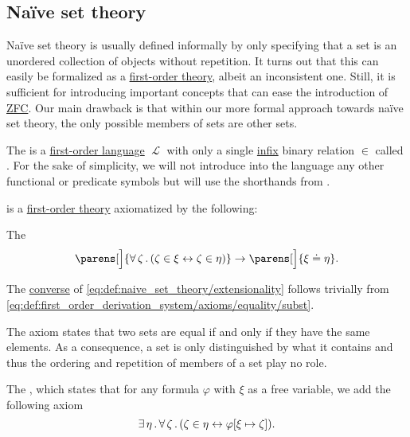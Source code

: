 \subsection{Na\"ive set theory}\label{subsec:naive_set_theory}

Na\"ive set theory is usually defined informally by only specifying that a set is an unordered collection of objects without repetition. It turns out that this can easily be formalized as a \hyperref[def:first_order_theory]{first-order theory}, albeit an inconsistent one. Still, it is sufficient for introducing important concepts that can ease the introduction of \hyperref[def:zfc]{ZFC}. Our main drawback is that within our more formal approach towards na\"ive set theory, the only possible members of sets are other sets.

\begin{definition}\label{def:naive_set_theory}
  The  is a \hyperref[def:first_order_syntax]{first-order language} \( \mscrL \) with only a single \hyperref[rem:first_order_formula_conventions/infix]{infix} binary relation \( \in \) called . For the sake of simplicity, we will not introduce into the language any other functional or predicate symbols but will use the shorthands from .

   is a \hyperref[def:first_order_theory]{first-order theory} axiomatized by the following:
  \begin{thmenum}
     The 
    \begin{equation}\label{eq:def:naive_set_theory/extensionality}
      \parens[\Big]{ \qforall \zeta (\zeta \in \xi \leftrightarrow \zeta \in \eta) } \rightarrow \parens[\Big]{ \xi \doteq \eta }.
    \end{equation}

    The \hyperref[def:material_implication/converse]{converse} of \eqref{eq:def:naive_set_theory/extensionality} follows trivially from \eqref{eq:def:first_order_derivation_system/axioms/equality/subst}.

    The axiom states that two sets are equal if and only if they have the same elements. As a consequence, a set is only distinguished by what it contains and thus the ordering and repetition of members of a set play no role.

     The , which states that for any formula \( \varphi \) with \( \xi \) as a free variable, we add the following axiom
    \begin{equation}\label{eq:def:naive_set_theory/unrestricted_comprehension}
      \exists \thinspace \eta \thinspace . \thinspace \forall \thinspace \zeta \thinspace . \thinspace (\zeta \in \eta \leftrightarrow \varphi[\xi \mapsto \zeta]).
    \end{equation}


\end{thmenum}
\end{definition}
